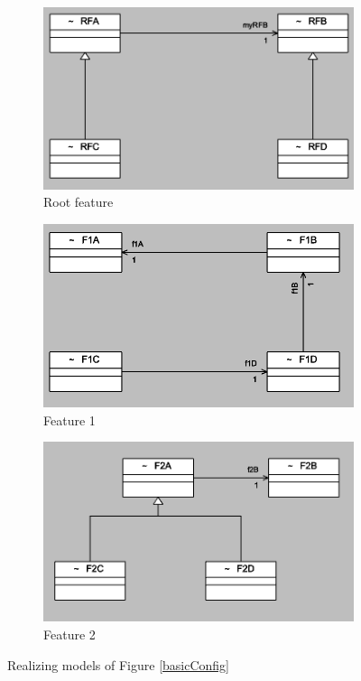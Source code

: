 \begin{figure}
	\centering
    \begin{subfigure}[b]{0.3\linewidth}
    	\includegraphics[width=\linewidth]{rootfeature.PNG}
        \caption{Root feature}
        \label{rootfeature}
    \end{subfigure}
    \begin{subfigure}[b]{0.3\linewidth}
    	\includegraphics[width=\linewidth]{feature1.PNG}
        \caption{Feature 1}
        \label{feature1}
    \end{subfigure}
    \begin{subfigure}[b]{0.3\linewidth}
    	\includegraphics[width=\linewidth]{feature2.PNG}
        \caption{Feature 2}
        \label{feature2}
    \end{subfigure}
	\caption{Realizing models of Figure \ref{basicConfig}}
    \label{basic realizing models}
\end{figure}

